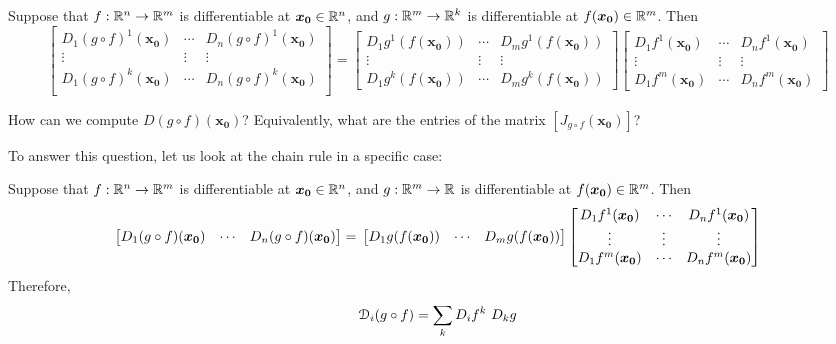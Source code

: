 \begin{example}
    Suppose that $f : \mathbb{R}^n \to \mathbb{R}^m$ is differentiable at $\bm{x_0} \in \mathbb{R}^n$, and $g: \mathbb{R}^m \to \mathbb{R}^k$ is differentiable at $f(\bm{x_0}) \in \mathbb{R}^m$. Then
    \begin{equation*}
        \begin{bmatrix}
D_1(g \circ f)^1(\bm{x_0}) & \cdots & D_n(g \circ f)^1(\bm{x_0}) \\
\vdots & \vdots & \vdots\\
D_1(g \circ f)^k(\bm{x_0}) & \cdots & D_n(g \circ f)^k(\bm{x_0}) \\
\end{bmatrix} = 
\begin{bmatrix}
D_1g^1(f(\bm{x_0})) & \cdots & D_mg^1(f(\bm{x_0})) \\
\vdots & \vdots & \vdots\\
D_1g^k(f(\bm{x_0}))  & \cdots & D_mg^k(f(\bm{x_0})) 
\end{bmatrix}
\begin{bmatrix}
D_1f^1(\bm{x_0}) & \cdots & D_nf^1(\bm{x_0}) \\
\vdots & \vdots & \vdots\\
D_1f^m(\bm{x_0})  & \cdots & D_nf^m(\bm{x_0}) 
\end{bmatrix}
    \end{equation*}
    \end{example}
    
\begin{motivating}
    How can we compute $D(g \circ f)(\bm{x_0})$?  Equivalently, what are the entries of the matrix $[J_{g\circ f}(\bm{x_0})]$?
\end{motivating}

To answer this question, let us look at the chain rule in a specific case:

\begin{example}
    Suppose that $f : \mathbb{R}^n \to \mathbb{R}^m$ is differentiable at $\bm{x_0} \in \mathbb{R}^n$, and $g: \mathbb{R}^m \to \mathbb{R}$ is differentiable at $f(\bm{x_0}) \in \mathbb{R}^m$. Then
    \begin{equation*}
        \begin{bmatrix}
D_1(g \circ f)(\bm{x_0}) & \cdots & D_n(g \circ f)(\bm{x_0}) 
\end{bmatrix} = \\
\begin{bmatrix}
D_1g(f(\bm{x_0})) & \cdots & D_mg(f(\bm{x_0})) 
\end{bmatrix}
\begin{bmatrix}
D_1f^1(\bm{x_0}) & \cdots & D_nf^1(\bm{x_0}) \\
\vdots & \vdots & \vdots\\
D_1f^m(\bm{x_0})  & \cdots & D_nf^m(\bm{x_0}) 
\end{bmatrix}
    \end{equation*}
    Therefore,
    $$\mathcal{D}_i(g \circ f) = \sum_k  D_i f^k \ D_k g$$
    \end{example}

